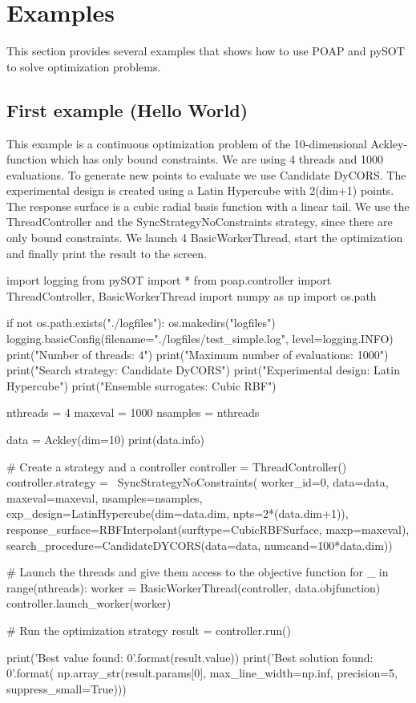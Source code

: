 \documentclass[]{article}
\begin{document}
\section{Examples}
This section provides several examples that shows how to use POAP and pySOT to solve optimization problems.

\subsection{First example (Hello World)}
This example is a continuous optimization problem of the 10-dimensional Ackley-function which has only bound constraints. We are using 4 threads and 1000 evaluations. To generate new points to evaluate we use Candidate DyCORS. The experimental design is created using a Latin Hypercube with 2(dim+1) points. The response surface is a cubic radial basis function with a linear tail. We use the ThreadController and the SyncStrategyNoConstraints strategy, since there are only bound constraints. We launch 4 BasicWorkerThread, start the optimization and finally print the result to the screen.

\begin{python}
import logging
from pySOT import *
from poap.controller import ThreadController, BasicWorkerThread
import numpy as np
import os.path

if not os.path.exists("./logfiles"):
    os.makedirs("logfiles")
logging.basicConfig(filename="./logfiles/test_simple.log",
                    level=logging.INFO)
print("Number of threads: 4")
print("Maximum number of evaluations: 1000")
print("Search strategy: Candidate DyCORS")
print("Experimental design: Latin Hypercube")
print("Ensemble surrogates: Cubic RBF")

nthreads = 4
maxeval = 1000
nsamples = nthreads

data = Ackley(dim=10)
print(data.info)

# Create a strategy and a controller
controller = ThreadController()
controller.strategy = \
    SyncStrategyNoConstraints(
        worker_id=0, data=data,
        maxeval=maxeval, nsamples=nsamples,
        exp_design=LatinHypercube(dim=data.dim, npts=2*(data.dim+1)),
        response_surface=RBFInterpolant(surftype=CubicRBFSurface,
                                        maxp=maxeval),
        search_procedure=CandidateDYCORS(data=data,
                                         numcand=100*data.dim))

# Launch the threads and give them access to the objective function
for _ in range(nthreads):
    worker = BasicWorkerThread(controller, data.objfunction)
    controller.launch_worker(worker)

# Run the optimization strategy
result = controller.run()

print('Best value found: {0}'.format(result.value))
print('Best solution found: {0}'.format(
    np.array_str(result.params[0], max_line_width=np.inf,
                 precision=5, suppress_small=True)))
\end{python}
\end{document}

